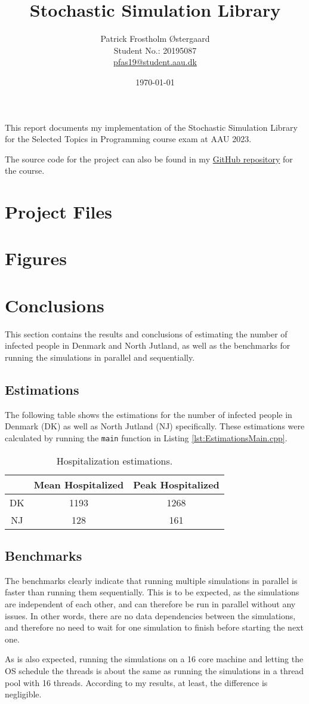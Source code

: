 \documentclass[a4paper]{article}
\title{Stochastic Simulation Library}
\author{Patrick Frostholm Østergaard\\Student No.: 20195087 \\ \url{pfas19@student.aau.dk}}
\date{\today}
\begin{document}
\maketitle

This report documents my implementation of the Stochastic Simulation Library for the Selected Topics in Programming course exam at AAU 2023.

The source code for the project can also be found in my \href{https://github.com/Pattrigue/selected-topics-in-programming}{\color{blue}GitHub repository} for the course.

\section{Project Files}


\section{Figures}


\section{Conclusions}
This section contains the results and conclusions of estimating the number of infected people in Denmark and North Jutland, as well as the benchmarks for running the simulations in parallel and sequentially.

\subsection{Estimations}
The following table shows the estimations for the number of infected people in Denmark (DK) as well as North Jutland (NJ) specifically.
These estimations were calculated by running the \texttt{main} function in Listing \ref{lst:EstimationsMain.cpp}.

\begin{table}[h]
\centering
\begin{tabular}{|c|c|c|}
\hline
& \textbf{Mean Hospitalized} & \textbf{Peak Hospitalized} \\
\hline
DK & 1193 & 1268 \\
NJ & 128 & 161 \\
\hline
\end{tabular}
\caption{Hospitalization estimations.}
\label{tab:hospitalization_estimations}
\end{table}

\subsection{Benchmarks}
The benchmarks clearly indicate that running multiple simulations in parallel is faster than running them sequentially.
This is to be expected, as the simulations are independent of each other, and can therefore be run in parallel without any issues.
In other words, there are no data dependencies between the simulations, and therefore no need to wait for one simulation to finish before starting the next one.

As is also expected, running the simulations on a 16 core machine and letting the OS schedule the threads is about the same as running the simulations in a thread pool with 16 threads.
According to my results, at least, the difference is negligible.
\end{document}

